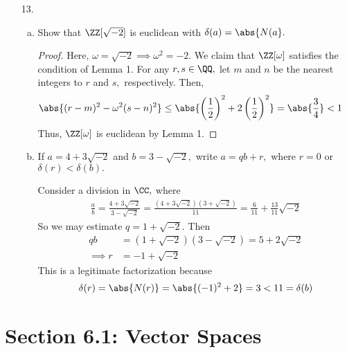 \documentclass{article}
\begin{document}
\begin{itemize}
	\item[13.] \begin{enumerate}[(a)]
			\item Show that $\ZZ[\sqrt{-2}]$ is euclidean with $\delta(a)=\abs{N(a}.$
				\begin{proof}
					Here, $\omega=\sqrt{-2}\implies\omega^2=-2.$ We claim that $\ZZ[\omega]$ satisfies the condition of Lemma 1. For any $r, s\in\QQ,$ let $m$ and $n$ be the nearest integers to $r$ and $s,$ respectively. Then,
					\begin{align*}
						\abs{(r-m)^2-\omega^2(s-n)^2} &\le \abs{\left( \frac{1}{2} \right)^2 + 2\left( \frac{1}{2} \right)^2} = \abs{\frac{3}{4}} < 1
					\end{align*}
					Thus, $\ZZ[\omega]$ is euclidean by Lemma 1.
				\end{proof}

				\newpage
			\item If $a=4+3\sqrt{-2}$ and $b=3-\sqrt{-2},$ write $a=qb+r,$ where $r=0$ or $\delta(r)<\delta(b).$
				\begin{soln}
					Consider a division in $\CC,$ where
					\begin{align*}
						\frac{a}{b} = \frac{4+3\sqrt{-2}}{3-\sqrt{-2}} = \frac{(4+3\sqrt{-2})(3+\sqrt{-2})}{11} = \frac{6}{11} + \frac{13}{11}\sqrt{-2}
					\end{align*}
					So we may estimate $q=1+\sqrt{-2}.$ Then
					\begin{align*}
						qb &= (1+\sqrt{-2})(3-\sqrt{-2}) = 5+2\sqrt{-2} \\
						\implies r &= -1+\sqrt{-2}
					\end{align*}
					This is a legitimate factorization because
					\[\delta(r)=\abs{N(r)}=\abs{(-1)^2+2}=3 < 11 = \delta(b)\]
				\end{soln}
				
		\end{enumerate}
		
\end{itemize}

\section*{Section 6.1: Vector Spaces}
\end{document}
